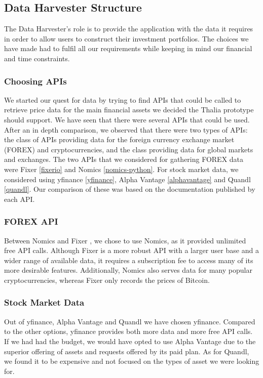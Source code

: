 \documentclass[main.tex]{subfiles}
\begin{document}
\subsection{Data Harvester Structure}

The Data Harvester's role is to provide the application with the data it requires in order to allow users to construct their investment portfolios. The choices we have made had to fulfil all our requirements while keeping in mind our financial and time constraints.

\subsubsection{Choosing APIs}
We started our quest for data by trying to find APIs that could be called to retrieve price data for the main financial assets we decided the Thalia prototype should support.
We have seen that there were several APIs that could be used. After an in depth comparison, we observed that there were two types of APIs: the class of APIs providing data for the foreign currency exchange market (FOREX) and cryptocurrencies, and the class providing data for global markets and exchanges. The two APIs that we considered for gathering FOREX data were Fixer \ref{fixerio} and Nomics \ref{nomics-python}. For stock market data, we considered using yfinance \ref{yfinance}, Alpha Vantage \ref{alphavantage} and Quandl \ref{quandl}. Our comparison of these was based on the documentation published by each API. \newline


\subsubsection*{FOREX API}
Between Nomics and Fixer \cite{fixerio}, we chose to use Nomics, as it provided unlimited free API calls. Although Fixer is a more robust API with a larger user base and a wider range of available data, it requires a subscription fee to access many of its more desirable features. Additionally, Nomics also serves data for many popular cryptocurrencies, whereas Fixer only records the prices of Bitcoin.  \newline

\subsubsection*{Stock Market Data}
Out of yfinance, Alpha Vantage \cite{alphavantage}and Quandl we have chosen yfinance. Compared to the other options, yfinance provides both more data and more free API calls. If we had had the budget, we would have opted to use Alpha Vantage due to the superior offering of assets and requests offered by its paid plan. As for Quandl, we found it to be expensive and not focused on the types of asset we were looking for. 
\end{document}
